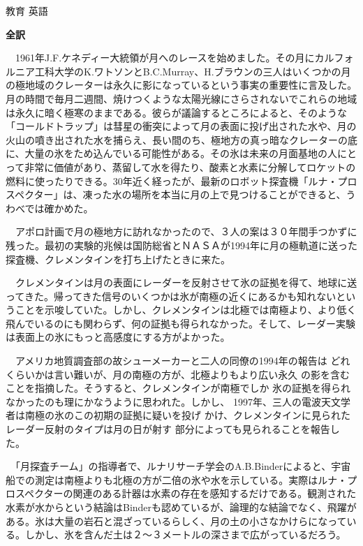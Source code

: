 \documentclass[fleqn]{jbook}
\begin{document}
\begin{answer}{教育 英語}{}
\begin{subanswers}
\SubAnswer
  {\bf 全訳}

　1961年J.F.ケネディー大統領が月へのレースを始めました。その月にカルフォルニア工科大学のK.ワトソンとB.C.Murray、H.ブラウンの三人はいくつかの月の極地域のクレーターは永久に影になっているという事実の重要性に言及した。月の時間で毎月二週間、焼けつくような太陽光線にさらされないでこれらの地域は永久に暗く極寒のままである。彼らが議論するところによると、そのような「コールドトラップ」は彗星の衝突によって月の表面に投げ出された水や、月の火山の噴き出された水を捕らえ、長い間のち、極地方の真っ暗なクレーターの底に、大量の氷をため込んでいる可能性がある。その氷は未来の月面基地の人にとって非常に価値があり、蒸留して水を得たり、酸素と水素に分解してロケットの燃料に使ったりできる。30年近く経ったが、最新のロボット探査機「ルナ・プロスペクター」は、凍った水の場所を本当に月の上で見つけることができると、うわべでは確かめた。

　アポロ計画で月の極地方に訪れなかったので、３人の案は３０年間手つかずに残った。最初の実験的兆候は国防総省とＮＡＳＡが1994年に月の極軌道に送った探査機、クレメンタインを打ち上げたときに来た。

　クレメンタインは月の表面にレーダーを反射させて氷の証拠を得て、地球に送ってきた。帰ってきた信号のいくつかは氷が南極の近くにあるかも知れないということを示唆していた。しかし、クレメンタインは北極では南極より、より低く飛んでいるのにも関わらず、何の証拠も得られなかった。そして、レーダー実験は表面上の氷にもっと高感度にする方がよかった。

　アメリカ地質調査部の故シューメーカーと二人の同僚の1994年の報告は
どれくらいかは言い難いが、月の南極の方が、北極よりもより広い永久
の影を含むことを指摘した。そうすると、クレメンタインが南極でしか
氷の証拠を得られなかったのも理にかなうように思われた。しかし、
1997年、三人の電波天文学者は南極の氷のこの初期の証拠に疑いを投げ
かけ、クレメンタインに見られたレーダー反射のタイプは月の日が射す
部分によっても見られることを報告した。

　「月探査チーム」の指導者で、ルナリサーチ学会のA.B.Binderによると、宇宙船での測定は南極よりも北極の方が二倍の氷や水を示している。実際はルナ・プロスペクターの関連のある計器は水素の存在を感知するだけである。観測された水素が水からという結論はBinderも認めているが、論理的な結論でなく、飛躍がある。氷は大量の岩石と混ざっているらしく、月の土の小さなかけらになっている。しかし、氷を含んだ土は２〜３メートルの深さまで広がっているだろう。


\end{subanswers}
\end{answer}
\end{document}
